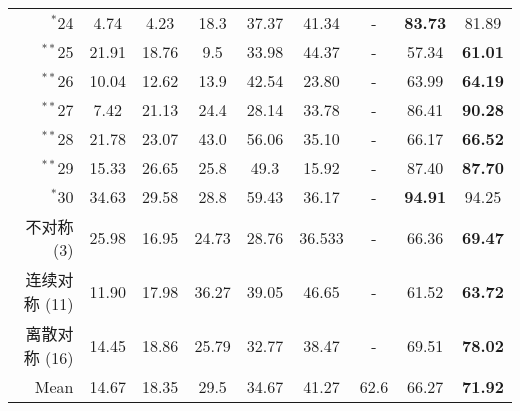 {\begin{longtable}{r| c c c c c c c c}
        $^*$24&4.74 &4.23 &18.3&37.37&41.34 &-&\textbf{83.73} &81.89 \\
        $^{**}$25&21.91 &18.76 &9.5&33.98&44.37 &-&57.34 &\textbf{61.01} \\
        $^{**}$26&10.04 &12.62 &13.9&42.54&23.80 &-&63.99 &\textbf{64.19} \\
        $^{**}$27&7.42 &21.13 &24.4&28.14&33.78 &-&86.41 &\textbf{90.28} \\
        $^{**}$28&21.78 &23.07 &43.0&56.06&35.10 &-&66.17 &\textbf{66.52} \\
        $^{**}$29&15.33 &26.65 &25.8&49.3&15.92 &-&87.40 &\textbf{87.70} \\
        $^*$30&34.63 &29.58 &28.8&59.43&36.17 &-&\textbf{94.91} &94.25 \\
        \midrule
        不对称 (3)&25.98&16.95&24.73&28.76&36.533&-&66.36&\textbf{69.47}\\
        连续对称 (11)&11.90&17.98&36.27&39.05&46.65&-&61.52&\textbf{63.72}\\
        离散对称 (16)&14.45&18.86&25.79&32.77&38.47&-&69.51&\textbf{78.02}\\
        \midrule
        Mean&14.67 &18.35 &29.5&34.67&41.27 &62.6&66.27&\textbf{71.92} \\
        \end{longtable}
        }

